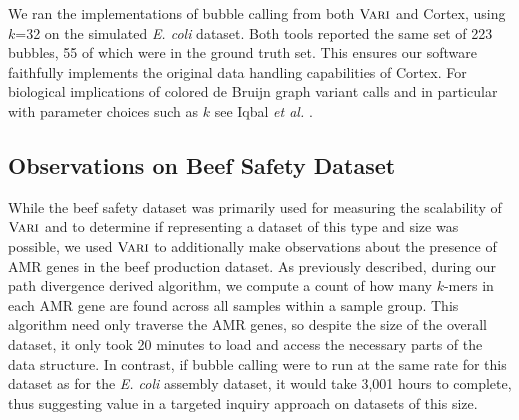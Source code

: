 We ran the implementations of bubble calling from both $\mbox{\rm {\sc Vari}}$ and {\sc Cortex}, using $k$=32 on the simulated \emph{E. coli} dataset.  Both tools reported the same set of 223 bubbles, 55 of which were in the ground truth set.  This ensures our software faithfully implements the original data handling capabilities of {\sc Cortex}.  For biological implications of colored de Bruijn graph variant calls and in particular with parameter choices such as $k$ see Iqbal {\it et al.} \citep{ICTFM12}.

\subsection{Observations on Beef Safety Dataset}

While the beef safety dataset was primarily used for measuring the scalability of $\mbox{\rm {\sc Vari}}$ and to determine if representing a dataset of this type and size was possible, we used $\mbox{\rm {\sc Vari}}$ to additionally make observations about the presence of AMR genes in the beef production dataset.  As previously described, during our path divergence derived algorithm, we compute a count of how many $k$-mers in each AMR gene are found across all samples within a sample group.  This algorithm need only traverse the AMR genes, so despite the size of the overall dataset, it only took 20 minutes to load and access the necessary parts of the data structure.  In contrast, if bubble calling were to run at the same rate for this dataset as for the {\it E. coli} assembly dataset, it would take 3,001 hours to complete, thus suggesting value in a targeted inquiry approach on datasets of this size.  

